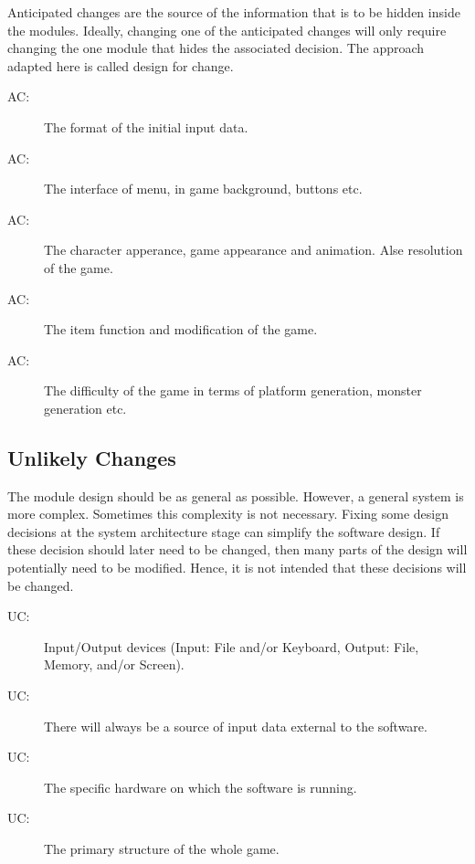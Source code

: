 \documentclass[12pt, titlepage]{article}
\newcounter{acnum}
\newcommand{\actheacnum}{AC\theacnum}
\newcounter{ucnum}
\newcommand{\uctheucnum}{UC\theucnum}
\begin{document}
Anticipated changes are the source of the information that is to be hidden
inside the modules. Ideally, changing one of the anticipated changes will only
require changing the one module that hides the associated decision. The approach
adapted here is called design for
change.

\begin{description}

\item[ \actheacnum \label{acInput}:] The format of the
  initial input data.
\item[ \actheacnum \label{acGUI}:] The interface of menu, in game background, buttons etc.
\item[ \actheacnum \label{acGraphics}:] The character apperance, game appearance and animation. Alse resolution of the game.
\item[ \actheacnum \label{acItems}:] The item function and modification of the game.
\item[ \actheacnum \label{acDifficulty}:] The difficulty of the game in terms of platform generation, monster generation etc.
\end{description}

\subsection{Unlikely Changes} \label{SecUchange}

The module design should be as general as possible. However, a general system is
more complex. Sometimes this complexity is not necessary. Fixing some design
decisions at the system architecture stage can simplify the software design. If
these decision should later need to be changed, then many parts of the design
will potentially need to be modified. Hence, it is not intended that these
decisions will be changed.

\begin{description}
\item[ \uctheucnum \label{ucIO}:] Input/Output devices
  (Input: File and/or Keyboard, Output: File, Memory, and/or Screen).
\item[ \uctheucnum \label{ucInput}:] There will always be
  a source of input data external to the software.
\item[ \uctheucnum \label{ucHardware}:] The specific
  hardware on which the software is running.
\item[ \uctheucnum \label{ucStructure}:] The primary structure of the whole game.
\end{description}
\end{document}
